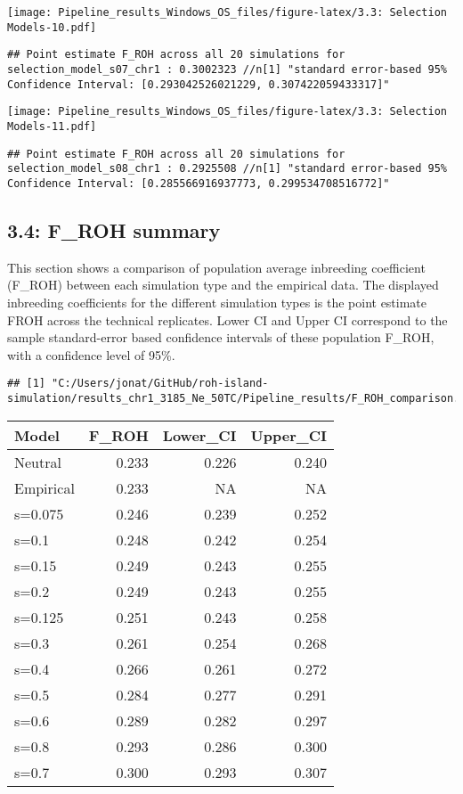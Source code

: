 \documentclass[
]{article}
\begin{document}
\texttt{[image: Pipeline\_results\_Windows\_OS\_files/figure-latex/3.3: Selection Models-10.pdf]}

\begin{verbatim}
## Point estimate F_ROH across all 20 simulations for  selection_model_s07_chr1 : 0.3002323 //n[1] "standard error-based 95% Confidence Interval: [0.293042526021229, 0.307422059433317]"
\end{verbatim}

\texttt{[image: Pipeline\_results\_Windows\_OS\_files/figure-latex/3.3: Selection Models-11.pdf]}

\begin{verbatim}
## Point estimate F_ROH across all 20 simulations for  selection_model_s08_chr1 : 0.2925508 //n[1] "standard error-based 95% Confidence Interval: [0.285566916937773, 0.299534708516772]"
\end{verbatim}

\subsection{3.4: F\_ROH summary}\label{f_roh-summary}

This section shows a comparison of population average inbreeding
coefficient (F\_ROH) between each simulation type and the empirical
data. The displayed inbreeding coefficients for the different simulation
types is the point estimate FROH across the technical replicates. Lower
CI and Upper CI correspond to the sample standard-error based confidence
intervals of these population F\_ROH, with a confidence level of 95\%.

\begin{verbatim}
## [1] "C:/Users/jonat/GitHub/roh-island-simulation/results_chr1_3185_Ne_50TC/Pipeline_results/F_ROH_comparison.txt"
\end{verbatim}

\begin{longtable}[]{@{}lrrr@{}}
\toprule\noalign{}
Model & F\_ROH & Lower\_CI & Upper\_CI \\
\midrule\noalign{}
\endhead
\bottomrule\noalign{}
\endlastfoot
Neutral & 0.233 & 0.226 & 0.240 \\
Empirical & 0.233 & NA & NA \\
s=0.075 & 0.246 & 0.239 & 0.252 \\
s=0.1 & 0.248 & 0.242 & 0.254 \\
s=0.15 & 0.249 & 0.243 & 0.255 \\
s=0.2 & 0.249 & 0.243 & 0.255 \\
s=0.125 & 0.251 & 0.243 & 0.258 \\
s=0.3 & 0.261 & 0.254 & 0.268 \\
s=0.4 & 0.266 & 0.261 & 0.272 \\
s=0.5 & 0.284 & 0.277 & 0.291 \\
s=0.6 & 0.289 & 0.282 & 0.297 \\
s=0.8 & 0.293 & 0.286 & 0.300 \\
s=0.7 & 0.300 & 0.293 & 0.307 \\
\end{longtable}
\end{document}
